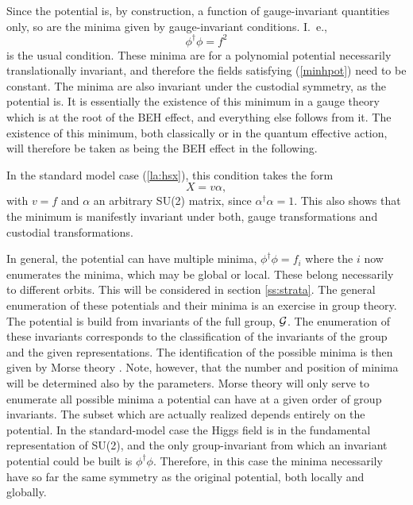 \documentclass[final,twoside,12pt]{article}
\newcommand*{\no}{\noindent}
\newcommand*{\be}{\begin{equation}}
\newcommand*{\ee}{\end{equation}}
\newcommand*{\pref}[1]{(\ref{#1})}
\newcommand*{\nn}{\nonumber}
\newcommand*{\1}{1\!\!\!\bot}
\begin{document}
Since the potential is, by construction, a function of gauge-invariant quantities only, so are the minima given by gauge-invariant conditions. I.\ e.,
\be
\phi^\dagger\phi=f^2\label{minhpot}
\ee
\no is the usual condition. These minima are for a polynomial potential necessarily translationally invariant, and therefore the fields satisfying \pref{minhpot} need to be constant. The minima are also invariant under the custodial symmetry, as the potential is. It is essentially the existence of this minimum in a gauge theory which is at the root of the BEH effect, and everything else follows from it. The existence of this minimum, both classically or in the quantum effective action, will therefore be taken as being the BEH effect in the following.

In the standard model case \pref{la:hsx}, this condition takes the form
\be
X=v\alpha\nn,
\ee
\no with $v=f$ and $\alpha$ an arbitrary SU(2) matrix, since $\alpha^\dagger\alpha=1$. This also shows that the minimum is manifestly invariant under both, gauge transformations and custodial transformations.

In general, the potential can have multiple minima, $\phi^\dagger\phi=f_i$ where the $i$ now enumerates the minima, which may be global or local. These belong necessarily to different orbits. This will be considered in section \ref{ss:strata}. The general enumeration of these potentials and their minima is an exercise in group theory. The potential is build from invariants of the full group, ${\cal G}$. The enumeration of these invariants corresponds to the classification of the invariants of the group and the given representations. The identification of the possible minima is then given by Morse theory \cite{O'Raifeartaigh:1986vq,Sartori:1992ib}. Note, however, that the number and position of minima will be determined also by the parameters. Morse theory will only serve to enumerate all possible minima a potential can have at a given order of group invariants. The subset which are actually realized depends entirely on the potential. In the standard-model case the Higgs field is in the fundamental representation of SU(2), and the only group-invariant from which an invariant potential could be built is $\phi^\dagger\phi$. Therefore, in this case the minima necessarily have so far the same symmetry as the original potential, both locally and globally.
\end{document}
